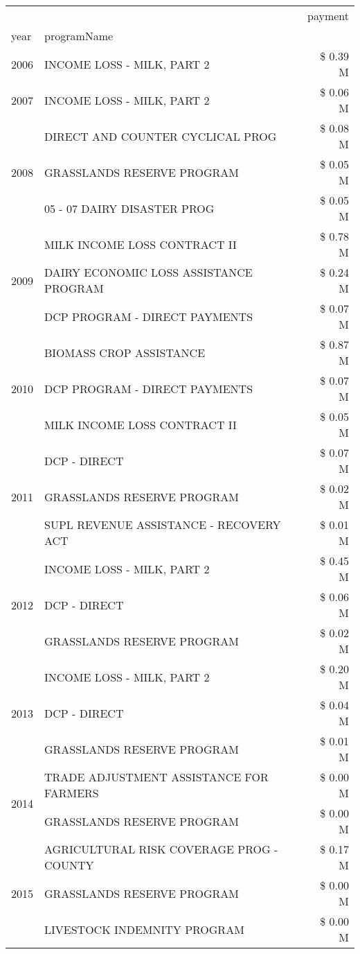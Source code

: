 \begin{tabular}{llr}
\toprule
 &  & payment \\
year & programName &  \\
\midrule
2006 & INCOME LOSS - MILK, PART 2 & \$ 0.39 M \\
\cline{1-3}
2007 & INCOME LOSS - MILK, PART 2 & \$ 0.06 M \\
\cline{1-3}
\multirow[t]{3}{*}{2008} & DIRECT AND COUNTER CYCLICAL PROG & \$ 0.08 M \\
 & GRASSLANDS RESERVE PROGRAM & \$ 0.05 M \\
 & 05 - 07 DAIRY DISASTER PROG & \$ 0.05 M \\
\cline{1-3}
\multirow[t]{3}{*}{2009} & MILK INCOME LOSS CONTRACT II & \$ 0.78 M \\
 & DAIRY ECONOMIC LOSS ASSISTANCE PROGRAM & \$ 0.24 M \\
 & DCP PROGRAM - DIRECT PAYMENTS & \$ 0.07 M \\
\cline{1-3}
\multirow[t]{3}{*}{2010} & BIOMASS CROP ASSISTANCE & \$ 0.87 M \\
 & DCP PROGRAM - DIRECT PAYMENTS & \$ 0.07 M \\
 & MILK INCOME LOSS CONTRACT II & \$ 0.05 M \\
\cline{1-3}
\multirow[t]{3}{*}{2011} & DCP - DIRECT & \$ 0.07 M \\
 & GRASSLANDS RESERVE PROGRAM & \$ 0.02 M \\
 & SUPL REVENUE ASSISTANCE - RECOVERY ACT & \$ 0.01 M \\
\cline{1-3}
\multirow[t]{3}{*}{2012} & INCOME LOSS - MILK, PART 2 & \$ 0.45 M \\
 & DCP - DIRECT & \$ 0.06 M \\
 & GRASSLANDS RESERVE PROGRAM & \$ 0.02 M \\
\cline{1-3}
\multirow[t]{3}{*}{2013} & INCOME LOSS - MILK, PART 2 & \$ 0.20 M \\
 & DCP - DIRECT & \$ 0.04 M \\
 & GRASSLANDS RESERVE PROGRAM & \$ 0.01 M \\
\cline{1-3}
\multirow[t]{2}{*}{2014} & TRADE ADJUSTMENT ASSISTANCE FOR FARMERS & \$ 0.00 M \\
 & GRASSLANDS RESERVE PROGRAM & \$ 0.00 M \\
\cline{1-3}
\multirow[t]{3}{*}{2015} & AGRICULTURAL RISK COVERAGE PROG - COUNTY & \$ 0.17 M \\
 & GRASSLANDS RESERVE PROGRAM & \$ 0.00 M \\
 & LIVESTOCK INDEMNITY PROGRAM & \$ 0.00 M \\

\end{tabular}
